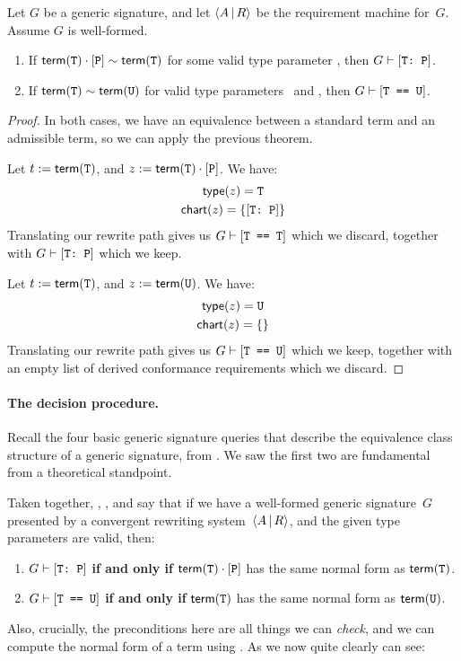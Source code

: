 \documentclass[../generics]{subfiles}
\begin{document}
\begin{corollary}\label{path to derivation language}
Let $G$ be a generic signature, and let $\langle A\,|\,R\rangle$ be the requirement machine for~$G$. Assume $G$ is well-formed.
\begin{enumerate}
\item If $\mathsf{term}(\texttt{T})\cdot[\texttt{P}] \sim \mathsf{term}(\texttt{T})$ for some valid type parameter \tT, then $G \vdash [\texttt{T:~P}]$.
\item If $\mathsf{term}(\texttt{T}) \sim \mathsf{term}(\texttt{U})$ for valid type parameters \tT\ and \tU, then $G\vdash[\texttt{T == U}]$.
\end{enumerate}
\end{corollary}
\begin{proof}
In both cases, we have an equivalence between a standard term and an admissible term, so we can apply the previous theorem.

 Let $t := \mathsf{term}(\texttt{T})$, and $z := \mathsf{term}(\texttt{T})\cdot[\texttt{P}]$. We have:
\begin{gather*}
\mathsf{type}(z)=\texttt{T}\\
\mathsf{chart}(z) = \{[\texttt{T:~P}]\}
\end{gather*}
Translating our rewrite path gives us $G\vdash[\texttt{T == T}]$ which we discard, together with $G\vdash[\texttt{T:~P}]$ which we keep.

 Let $t := \mathsf{term}(\texttt{T})$, and $z := \mathsf{term}(\texttt{U})$. We have:
\begin{gather*}
\mathsf{type}(z) = \texttt{U}\\
\mathsf{chart}(z)=\{\}
\end{gather*}
Translating our rewrite path gives us $G\vdash[\texttt{T == U}]$ which we keep, together with an empty list of derived conformance requirements which we discard.
\end{proof}

\paragraph{The decision procedure.} Recall the four basic generic signature queries that describe the equivalence class structure of a generic signature, from . We saw the first two are fundamental from a theoretical standpoint.

Taken together, , , and  say that if we have a well-formed generic signature~$G$ presented by a convergent rewriting system~$\langle A\,|\,R\rangle$, and the given type parameters are valid, then:
\begin{enumerate}
\item $G\vdash[\texttt{T:~P}]$ \textbf{if and only if} $\mathsf{term}(\texttt{T})\cdot[\texttt{P}]$ has the same normal form as $\mathsf{term}(\texttt{T})$.
\item $G\vdash[\texttt{T == U}]$ \textbf{if and only if} $\mathsf{term}(\texttt{T})$ has the same normal form as $\mathsf{term}(\texttt{U})$.
\end{enumerate}
Also, crucially, the preconditions here are all things we can \emph{check}, and we can compute the normal form of a term using . As we now quite clearly can see:
\end{document}
